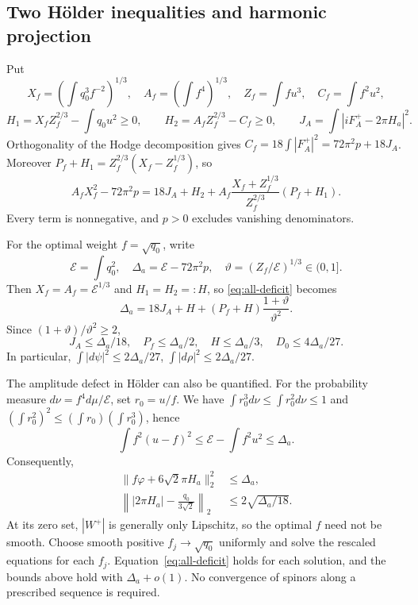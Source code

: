 \documentclass[a4paper,11pt]{article}
\numberwithin{equation}{section}
\theoremstyle{definition}
\begin{document}
\subsection{Two H\"older inequalities and harmonic projection}
Put
\[
X_f=\left(\int q_0^3f^{-2}\right)^{1/3},\quad
A_f=\left(\int f^4\right)^{1/3},\quad
Z_f=\int fu^3,\quad C_f=\int f^2u^2,
\]
\[
H_1=X_fZ_f^{2/3}-\int q_0u^2\ge0,\qquad
H_2=A_fZ_f^{2/3}-C_f\ge0,\qquad
J_A=\int|iF_A^+-2\pi H_a|^2.
\]
Orthogonality of the Hodge decomposition gives
$C_f=18\int|F_A^+|^2=72\pi^2p+18J_A$.
Moreover $P_f+H_1=Z_f^{2/3}(X_f-Z_f^{1/3})$, so
\begin{equation}\label{eq:all-deficit}
A_fX_f^2-72\pi^2p
=18J_A+H_2+
A_f\frac{X_f+Z_f^{1/3}}{Z_f^{2/3}}(P_f+H_1).
\end{equation}
Every term is nonnegative, and $p>0$ excludes vanishing denominators.

For the optimal weight $f=\sqrt{q_0}$, write
\[
\mathcal E=\int q_0^2,\quad
\Delta_a=\mathcal E-72\pi^2p,\quad
\vartheta=(Z_f/\mathcal E)^{1/3}\in(0,1].
\]
Then $X_f=A_f=\mathcal E^{1/3}$ and $H_1=H_2=:H$, so \eqref{eq:all-deficit} becomes
\[
\Delta_a=18J_A+H+(P_f+H)\frac{1+\vartheta}{\vartheta^2}.
\]
Since $(1+\vartheta)/\vartheta^2\ge2$,
\begin{equation}\label{eq:quantSW}
J_A\le\Delta_a/18,\quad P_f\le\Delta_a/2,\quad
H\le\Delta_a/3,\quad D_0\le4\Delta_a/27.
\end{equation}
In particular,
$\int|d\psi|^2\le2\Delta_a/27$,
$\int|d\rho|^2\le2\Delta_a/27$.

The amplitude defect in H\"older can also be quantified. For the probability measure
$d\nu=f^4d\mu/\mathcal E$, set $r_0=u/f$.
We have $\int r_0^3d\nu\le\int r_0^2d\nu\le1$ and
$(\int r_0^2)^2\le(\int r_0)(\int r_0^3)$, hence
\[
\int f^2(u-f)^2\le\mathcal E-\int f^2u^2\le\Delta_a.
\]
Consequently,
\begin{align}
\|f\varphi+6\sqrt2\pi H_a\|_2^2&\le\Delta_a,\label{eq:formprojection}\\
\left\||2\pi H_a|-\frac{q_0}{3\sqrt2}\right\|_2
&\le2\sqrt{\Delta_a/18}.\label{eq:harmonicnorm}
\end{align}
At its zero set, $|W^+|$ is generally only Lipschitz, so the optimal $f$ need not be smooth.
Choose smooth positive $f_j\to\sqrt{q_0}$ uniformly and solve the rescaled equations for each $f_j$.
Equation~\eqref{eq:all-deficit} holds for each solution, and the bounds above hold with $\Delta_a+o(1)$.
No convergence of spinors along a prescribed sequence is required.
\end{document}
